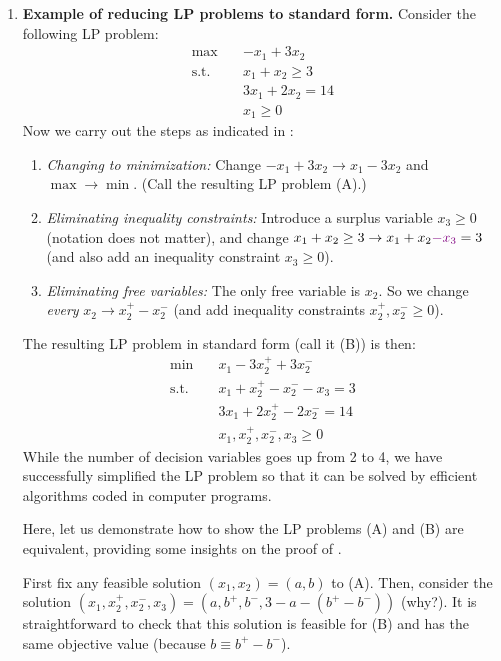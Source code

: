\begin{enumerate}
\item \textbf{Example of reducing LP problems to standard form.} Consider the
following LP problem:
\begin{align*}
\text{max}\quad&-x_1+3x_2 \\
\text{s.t.}\quad&x_1+x_2\ge 3\\
\quad&3x_1+2x_2=14 \\
\quad&x_1\ge 0
\end{align*}
Now we carry out the steps as indicated in :
\begin{enumerate}[label={(\arabic*)}]
\item \emph{Changing to minimization:} Change \(-x_1+3x_2\to x_1-3x_2\) and \(\max\to\min\). (Call the resulting LP problem (A).)
\item \emph{Eliminating inequality constraints:} Introduce a surplus variable
\(x_3\ge 0\) (notation does not matter), and change \(x_1+x_2\ge 3\to
x_1+x_2{\color{violet}-x_3}=3\) (and also add an inequality constraint \(x_3\ge 0\)).
\item \emph{Eliminating free variables:} The only free variable is \(x_2\). So
we change \emph{every} \(x_2\to x_2^{+}-x_2^{-}\) (and add inequality
constraints \(x_2^{+},x_2^{-}\ge 0\)).
\end{enumerate}
The resulting LP problem in standard form (call it (B)) is then:
\begin{align*}
\text{min}\quad&x_1-3x_2^{+}+3x_2^{-} \\
\text{s.t.}\quad&x_1+x_2^{+}-x_2^{-}-x_3= 3\\
\quad&3x_1+2x_2^{+}-2x_2^{-}=14 \\
\quad&x_1,x_2^{+},x_2^{-},x_3\ge 0
\end{align*}
While the number of decision variables goes up from 2 to 4, we have
successfully simplified the LP problem so that it can be solved by efficient
algorithms coded in computer programs.

Here, let us demonstrate how to show the LP problems (A) and (B) are
equivalent, providing some insights on the proof of .

\begin{pf}
First fix any feasible solution \((x_1,x_2)=(a,b)\) to (A). Then, consider the
solution \((x_1,x_2^{+},x_2^{-},x_3)=(a,b^{+},b^{-},3-a-(b^{+}-b^{-}))\) (why?).
It is straightforward to check that this solution is feasible for (B) and has
the same objective value (because \(b\equiv b^{+}-b^{-}\)).


\end{pf}
\end{enumerate}
